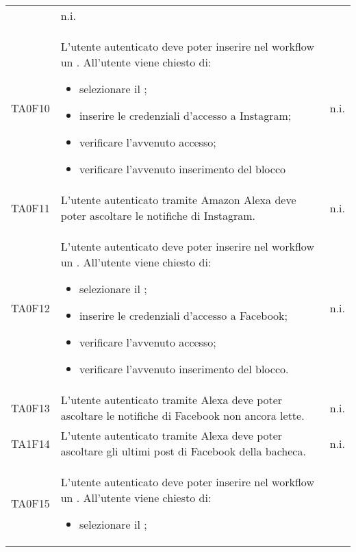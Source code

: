 \begin{center}
\begin{longtable}{ c m{12cm} c }
\begin{itemize}
	\end{itemize}   																												   											& n.i. \\
	TA0F10   & L'utente autenticato deve poter inserire nel workflow un \BInstagram. All'utente viene chiesto di: 
	\begin{itemize}											
		\item selezionare il \BInstagram;											
		\item inserire le credenziali d'accesso a Instagram;											
		\item verificare l'avvenuto accesso;											
		\item verificare l'avvenuto inserimento del blocco											
	\end{itemize} & n.i. \\                                          											
	TA0F11  & L'utente autenticato tramite Amazon Alexa deve poter ascoltare le notifiche di Instagram.                                       											& n.i. \\
	TA0F12  & L'utente autenticato deve poter inserire nel workflow un \BFacebook. All'utente viene chiesto di: \begin{itemize}										
		\item selezionare il \BFacebook;										
		\item inserire le credenziali d'accesso a Facebook;										
		\item verificare l'avvenuto accesso;										
		\item verificare l'avvenuto inserimento del blocco.										
	\end{itemize} & n.i. \\										
	TA0F13   & L'utente autenticato tramite Alexa deve poter ascoltare le notifiche di Facebook non ancora lette.                        										& n.i. \\
	TA1F14   & L'utente autenticato tramite Alexa deve poter ascoltare gli ultimi post di Facebook della bacheca.                      										& n.i. \\
	TA0F15   & L'utente autenticato deve poter inserire nel workflow un \BLinkedIn. All'utente viene chiesto di: 
	\begin{itemize}										
		\item selezionare il \BLinkedIn;										

\end{itemize}
\end{longtable}
\end{center}
